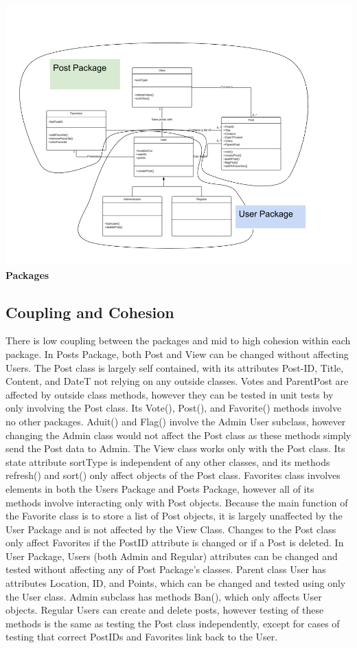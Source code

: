 \documentclass[12pt]{article}
\begin{document}
\begin{center}
\includegraphics[scale=0.25]{img/uml/packages}\linebreak
\textbf{Packages}
  \end{center}

\subsection{Coupling and Cohesion}

There is low coupling between the packages and mid to high cohesion within each package.
In Posts Package, both Post and View can be changed without affecting Users. The Post class is largely self contained, with its attributes Post-ID, Title, Content, and DateT not relying on any outside classes. Votes and ParentPost are affected by outside class methods, however they can be tested in unit tests by only involving the Post class. Its Vote(), Post(), and Favorite() methods involve no other packages. Aduit() and Flag() involve the Admin User subclass, however changing the Admin class would not affect the Post class as these methods simply send the Post data to Admin. The View class works only with the Post class. Its state attribute sortType is independent of any other classes, and its methods refresh() and sort() only affect objects of the Post class. Favorites class involves elements in both the Users Package and Posts Package, however all of its methods involve interacting only with Post objects. Because the main function of the Favorite class is to store a list of Post objects, it is largely unaffected by the User Package and is not affected by the View Class. Changes to the Post class only affect Favorites if the PostID attribute is changed or if a Post is deleted.
In User Package, Users (both Admin and Regular) attributes can be changed and tested without affecting any of Post Package’s classes. Parent class User has attributes Location, ID, and Points, which can be changed and tested using only the User class. Admin subclass has methods Ban(), which only affects User objects. Regular Users can create and delete posts, however testing of these methods is the same as testing the Post class independently, except for cases of testing that correct PostIDs and Favorites link back to the User.
\end{document}
